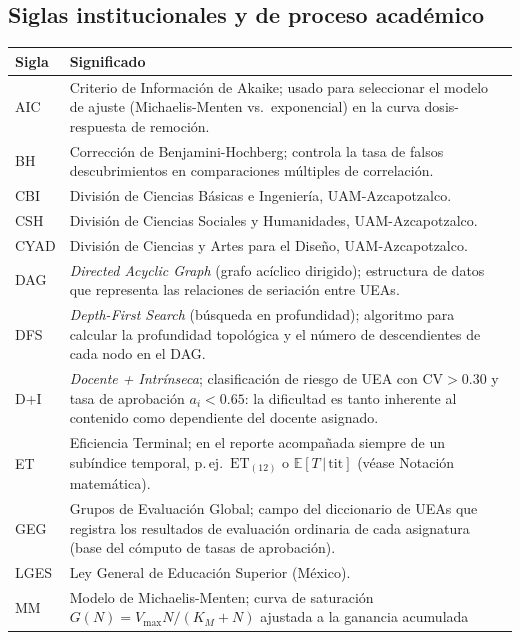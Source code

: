 \documentclass[11pt,letterpaper]{article}
\newcommand{\ET}[1]{\mathrm{ET}_{(#1)}}
\newcommand{\ETtit}{\mathbb{E}[T\,|\,\mathrm{tit}]}
\begin{document}
\subsection{Siglas institucionales y de proceso académico}

\begin{tabularx}{\linewidth}{@{}lX@{}}
\toprule
Sigla & Significado \\
\midrule
AIC     & Criterio de Información de Akaike; usado para seleccionar el modelo
          de ajuste (Michaelis-Menten vs.\ exponencial) en la curva
          dosis-respuesta de remoción. \\[4pt]
BH      & Corrección de Benjamini-Hochberg; controla la tasa de falsos
          descubrimientos en comparaciones múltiples de correlación. \\[4pt]
CBI     & División de Ciencias Básicas e Ingeniería, UAM-Azcapotzalco. \\[4pt]
CSH     & División de Ciencias Sociales y Humanidades, UAM-Azcapotzalco. \\[4pt]
CYAD    & División de Ciencias y Artes para el Diseño, UAM-Azcapotzalco. \\[4pt]
DAG     & \emph{Directed Acyclic Graph} (grafo acíclico dirigido); estructura
          de datos que representa las relaciones de seriación entre UEAs. \\[4pt]
DFS     & \emph{Depth-First Search} (búsqueda en profundidad); algoritmo para
          calcular la profundidad topológica y el número de descendientes
          de cada nodo en el DAG. \\[4pt]
D+I     & \emph{Docente + Intrínseca}; clasificación de riesgo de UEA con
          $\mathrm{CV}>0.30$ y tasa de aprobación $a_i < 0.65$:
          la dificultad es tanto inherente al contenido como dependiente
          del docente asignado. \\[4pt]
ET      & Eficiencia Terminal; en el reporte acompañada siempre de un
          subíndice temporal, p.\,ej.\ $\ET{12}$ o $\ETtit$
          (véase Notación matemática). \\[4pt]
GEG     & Grupos de Evaluación Global; campo del diccionario de UEAs que
          registra los resultados de evaluación ordinaria de cada asignatura
          (base del cómputo de tasas de aprobación). \\[4pt]
LGES    & Ley General de Educación Superior (México). \\[4pt]
MM      & Modelo de Michaelis-Menten; curva de saturación
          $G(N)=V_{\max}N/(K_M+N)$ ajustada a la ganancia acumulada

\end{tabularx}
\end{document}
